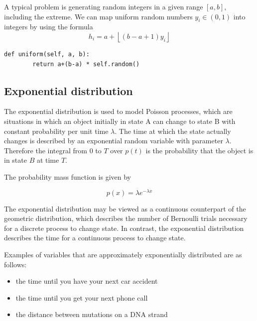 \documentclass[justified, sixbynine]{tufte-book}
\def\ft{\small\tt}
\theoremstyle{plain}%
\newtheorem * {corollary}{Corollary}
\theoremstyle{definition}
\theoremstyle{remark}
\newtheorem * {remark}{Remark}
\newtheorem * {note}{Note}
\begin{document}
\begin{fullwidth}
A typical problem is generating random integers in a given range $[a, b]$, 
including the extreme. We can map uniform random numbers $y_i\in (0, 1)$
into integers by using the formula
\begin{equation}
h_i=a+\left\lfloor (b-a+1)y_i\right\rfloor
\end{equation}

\begin{lstlisting}[caption={in file: {\ft nlib.py}}]
    def uniform(self, a, b):
        return a+(b-a) * self.random()
\end{lstlisting}

\goodbreak\subsection{Exponential distribution}

The exponential distribution is used to model Poisson processes, which are
situations in which an object initially in state A can change to state B
with constant probability per unit time $\lambda $. The time at which the
state actually changes is described by an exponential random variable with
parameter $\lambda $. Therefore the integral from $0$ to $T$ over $p(t)$ is
the probability that the object is in state $B$ at time $T$.

The probability mass function is given by

\begin{equation}
p(x)=\lambda e^{-\lambda x}
\end{equation}

The exponential distribution may be viewed as a continuous counterpart of
the geometric distribution, which describes the number of Bernoulli trials
necessary for a discrete process to change state. In contrast, the
exponential distribution describes the time for a continuous process to
change state.

Examples of variables that are approximately exponentially distributed are as follows:

\begin{itemize}
\item  the time until you have your next car accident

\item  the time until you get your next phone call

\item  the distance between mutations on a DNA strand


\end{itemize}
\end{fullwidth}
\end{document}
